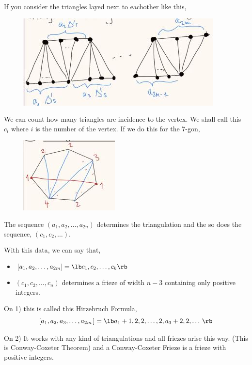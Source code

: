 \documentclass{article}
\begin{document}
If you consider the triangles layed next to eachother like this,
\begin{figure}[!ht]
  \centering
  \includegraphics{./figures/L1.2}
  \caption{}
\end{figure}
We can count how many triangles are incidence to the vertex. We shall call this $c_i$ where $i$ is the number of the vertex. If we do this for the 7-gon,
\begin{figure}[!ht]
  \centering
  \includegraphics{./figures/L1.3}
  \caption{}
\end{figure}
The sequence $(a_1, a_2, \dots, a_{2n})$ determines the triangulation and the so does the sequence, $(c_1, c_2, \dots)$.

\begin{nthm}
  With this data, we can say that,
  \begin{itemize}
    \item $[a_1, a_2, \dots, a_{2m}] = \lb  c_1, c_2, \dots, c_k \rb $
    \item $(c_1, c_2, \dots, c_n)$ determines a frieze of width $n-3$ containing only positive integers.
  \end{itemize}
\end{nthm}

\begin{remark}
  On 1) this is called this Hirzebruch Formula,
  $$ [a_1, a_2, a_3, \dots, a_{2m}\,] = \lb  a_1+1, 2, 2, \dots, 2, a_3+2, 2, \dots \,\rb  $$
\end{remark}

\begin{remark}
  On 2) It works with any kind of triangulations and all friezes arise this way. (This is Conway-Coxeter Theorem) and a Conway-Coxeter Frieze is a frieze with positive integers.
\end{remark}
\end{document}
